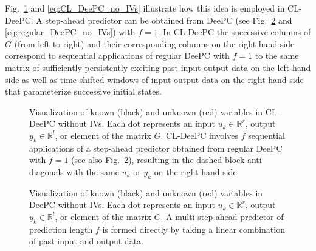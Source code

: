 Fig.~\ref{fig:CL-DeePC} and \eqref{eq:CL_DeePC_no_IVs} illustrate how this idea is employed in \ac{CL-DeePC}. A step-ahead predictor can be obtained from \ac{DeePC} (see Fig.~\ref{fig:regular-DeePC} and \eqref{eq:regular_DeePC_no_IVs}) with $f=1$. In \ac{CL-DeePC} the successive columns of $G$ (from left to right) and their corresponding columns on the right-hand side correspond to sequential applications of regular \ac{DeePC} with $f=1$ to the same matrix of sufficiently persistently exciting past input-output data on the left-hand side as well as time-shifted windows of input-output data on the right-hand side that parameterize successive initial states.\\
%
\begin{figure}[b!]
\centering

\caption{Visualization of known (black) and unknown (red) variables in \ac{CL-DeePC} without \ac{IVs}. Each dot represents an input $u_k\in\mathbb{R}^r$, output $y_k\in\mathbb{R}^l$, or element of the matrix $G$. \ac{CL-DeePC} involves $f$ sequential applications of a step-ahead predictor obtained from regular \ac{DeePC} with $f=1$ (see also Fig.~\ref{fig:regular-DeePC}), resulting in the dashed block-anti diagonals with the same $u_k$ or $y_k$ on the right hand side.}
\label{fig:CL-DeePC}
\end{figure}
\begin{figure}[b!]
\centering

\caption{Visualization of known (black) and unknown (red) variables in \ac{DeePC} without \ac{IVs}. Each dot represents an input $u_k\in\mathbb{R}^r$, output $y_k\in\mathbb{R}^l$, or element of the matrix $G$. A multi-step ahead predictor of prediction length $f$ is formed directly by taking a linear combination of past input and output data.\\\vspace{0.75mm}}
\label{fig:regular-DeePC}
\end{figure}
%
\setcounter{thm}{0}
